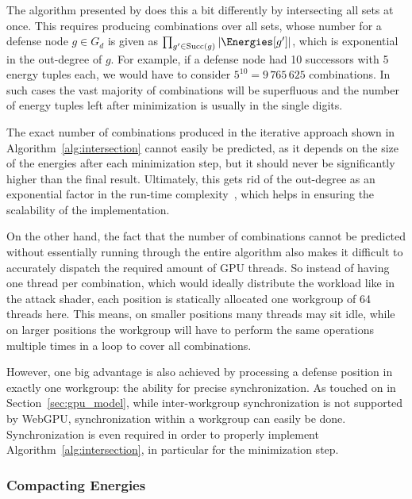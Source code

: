 The algorithm presented by \textcite{bisping2023process} does this a bit
differently by intersecting all sets at once.
This requires producing combinations over all sets,
whose number for a defense node $g \in G_d$ is given as
$\prod_{g' \in \mathrm{Succ}(g)} |\Energies[g']|$,
which is exponential in the out-degree of $g$.
For example, if a defense node had 10 successors with 5 energy tuples each,
we would have to consider $5^{10} = 9\,765\,625$ combinations.
In such cases the vast majority of combinations will be superfluous and
the number of energy tuples left after minimization is usually in the single
digits.

The exact number of combinations produced in the iterative approach shown in
Algorithm~\ref{alg:intersection} cannot easily be predicted,
as it depends on the size of the energies after each minimization step,
but it should never be significantly higher than the final result.
Ultimately, this gets rid of the out-degree as an exponential factor in the
run-time complexity~\cite{brihaye2023multi},
which helps in ensuring the scalability of the implementation.

On the other hand, the fact that the number of combinations cannot be predicted
without essentially running through the entire algorithm
also makes it difficult to accurately dispatch the required amount of GPU
threads.
So instead of having one thread per combination,
which would ideally distribute the workload like in the attack shader,
each position is statically allocated one workgroup of 64 threads here.
This means, on smaller positions many threads may sit idle,
while on larger positions the workgroup will have to perform the same
operations multiple times in a loop to cover all combinations.

However, one big advantage is also achieved by processing a defense position in
exactly one workgroup:
the ability for precise synchronization.
As touched on in Section~\ref{sec:gpu_model},
while inter-workgroup synchronization is not supported by \mbox{WebGPU},
synchronization within a workgroup can easily be done.
Synchronization is even required in order to properly implement
Algorithm~\ref{alg:intersection}, in particular for the minimization step.

\subsubsection{Compacting Energies}

